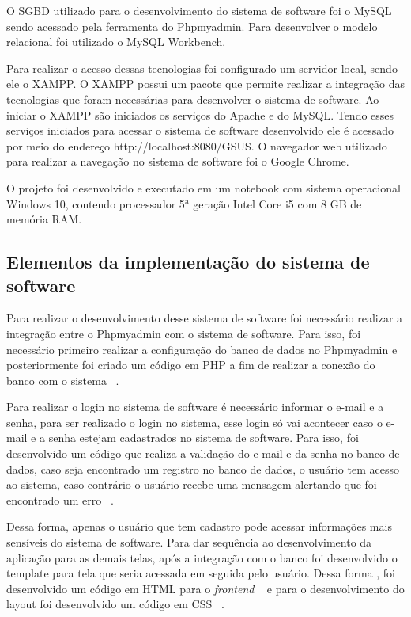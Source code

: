 O \acrfull{SGBD} utilizado para o desenvolvimento do sistema de software foi o MySQL sendo acessado pela ferramenta do Phpmyadmin. Para desenvolver o modelo relacional foi utilizado o MySQL Workbench. 

Para realizar o acesso dessas tecnologias foi configurado um servidor local, sendo ele o XAMPP. O XAMPP possui um pacote que permite realizar a integração das tecnologias que foram necessárias para desenvolver o sistema de software.
Ao iniciar o XAMPP são iniciados os serviços do Apache e do MySQL. Tendo esses serviços iniciados para acessar o sistema de software desenvolvido ele é acessado por meio do endereço http://localhost:8080/GSUS. O navegador web utilizado para realizar a navegação no sistema de software foi o Google Chrome.

O projeto foi desenvolvido e executado em um notebook com sistema operacional Windows 10, contendo processador \newcommand{\azinho}{$^{\mathrm a}$} 5$^{\mathrm a}$ geração Intel Core i5 com 8 GB de memória RAM.

\subsection{Elementos da implementação do sistema de software}

Para realizar o desenvolvimento desse sistema de software foi necessário realizar a integração entre o Phpmyadmin com o sistema de software. Para isso, foi necessário primeiro realizar a configuração do banco de dados no Phpmyadmin e posteriormente foi criado um código em PHP a fim de realizar a conexão do banco com o sistema ~.

%

Para realizar o login no sistema de software é necessário informar o e-mail e a senha, para ser realizado o login no sistema, esse login só vai acontecer caso o e-mail e a senha estejam cadastrados no sistema de software. Para isso, foi desenvolvido um código que realiza a validação do e-mail e da senha no banco de dados, caso seja encontrado um registro no banco de dados, o usuário tem acesso ao sistema, caso contrário o usuário recebe uma mensagem alertando que foi encontrado um erro ~.


%

Dessa forma, apenas o usuário que tem cadastro pode acessar informações mais sensíveis do sistema de software.
Para dar sequência ao desenvolvimento da aplicação para as demais telas, após a integração com o banco foi desenvolvido o template para tela que seria acessada em seguida pelo usuário. Dessa forma , foi desenvolvido um código em \acrfull{HTML} para o \emph{frontend} ~ e para o desenvolvimento do layout foi desenvolvido um código em \acrfull{CSS} ~. 

